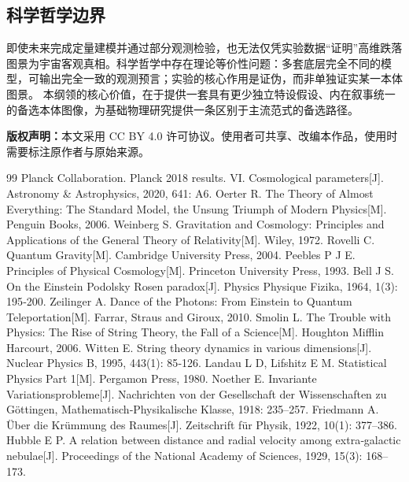 \documentclass[UTF8]{csoarticle}
\begin{document}
\subsection{科学哲学边界}
即使未来完成定量建模并通过部分观测检验，也无法仅凭实验数据“证明”高维跌落图景为宇宙客观真相。科学哲学中存在理论等价性问题：多套底层完全不同的模型，可输出完全一致的观测预言；实验的核心作用是证伪，而非单独证实某一本体图景。
本纲领的核心价值，在于提供一套具有更少独立特设假设、内在叙事统一的备选本体图像，为基础物理研究提供一条区别于主流范式的备选路径。

\vspace{1em}
\noindent \textbf{版权声明：}本文采用 CC BY 4.0 许可协议。使用者可共享、改编本作品，使用时需要标注原作者与原始来源。

\begin{thebibliography}{99}
 Planck Collaboration. Planck 2018 results. VI. Cosmological parameters[J]. Astronomy \& Astrophysics, 2020, 641: A6.
 Oerter R. The Theory of Almost Everything: The Standard Model, the Unsung Triumph of Modern Physics[M]. Penguin Books, 2006.
 Weinberg S. Gravitation and Cosmology: Principles and Applications of the General Theory of Relativity[M]. Wiley, 1972.
 Rovelli C. Quantum Gravity[M]. Cambridge University Press, 2004.
 Peebles P J E. Principles of Physical Cosmology[M]. Princeton University Press, 1993.
 Bell J S. On the Einstein Podolsky Rosen paradox[J]. Physics Physique Fizika, 1964, 1(3): 195‑200.
 Zeilinger A. Dance of the Photons: From Einstein to Quantum Teleportation[M]. Farrar, Straus and Giroux, 2010.
 Smolin L. The Trouble with Physics: The Rise of String Theory, the Fall of a Science[M]. Houghton Mifflin Harcourt, 2006.
 Witten E. String theory dynamics in various dimensions[J]. Nuclear Physics B, 1995, 443(1): 85‑126.
 Landau L D, Lifshitz E M. Statistical Physics Part 1[M]. Pergamon Press, 1980.
 Noether E. Invariante Variationsprobleme[J]. Nachrichten von der Gesellschaft der Wissenschaften zu Göttingen, Mathematisch‑Physikalische Klasse, 1918: 235–257.
 Friedmann A. Über die Krümmung des Raumes[J]. Zeitschrift für Physik, 1922, 10(1): 377–386.
 Hubble E P. A relation between distance and radial velocity among extra‑galactic nebulae[J]. Proceedings of the National Academy of Sciences, 1929, 15(3): 168–173.

\end{thebibliography}
\end{document}
